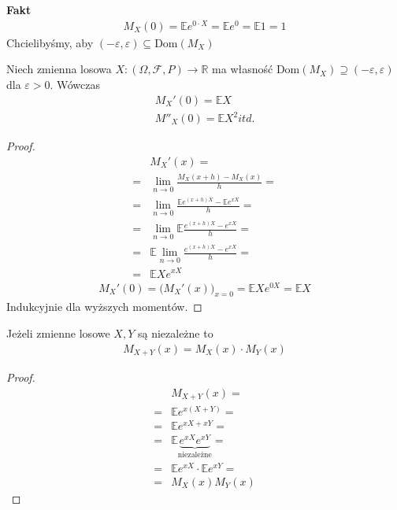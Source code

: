 \textbf{Fakt}\\
\begin{gather*}
M_X(0)=\mathbb E e^{0\cdot X}=\mathbb E e^0=\mathbb E 1=1
\end{gather*}
Chcielibyśmy, aby $ (-\varepsilon,\varepsilon)\subseteq\text{Dom}\left(M_X\right) $
\begin{twr}
Niech zmienna losowa $ X:\left(\Omega,\mathcal F ,P\right) \to \mathbb R $  ma własność Dom$ \left(M_X\right)\supseteq \left(-\varepsilon,\varepsilon\right) $ dla $ \varepsilon>0$. Wówczas
\begin{gather*}
M_X'(0)=\mathbb E X\\
M''_X(0)=\mathbb E X^2
itd.
\end{gather*}
\end{twr}
\begin{proof}
\begin{align*}
&M_X'(x)
=\\=&
\lim\limits_{n\to0}\frac{M_X(x+h)-M_X(x)}{h}
=\\=&
\lim\limits_{n\to0}\frac{\mathbb E e^{(x+h)X}-\mathbb E e^{xX}}{h}
=\\=&
\lim\limits_{n\to0}\mathbb E \frac{e^{(x+h)X}-e^{xX}}{h}
=\\=&
\mathbb E \lim\limits_{n\to0}\frac{e^{(x+h)X}-e^{xX}}{h}
=\\=&
\mathbb E Xe^{xX}
\end{align*}
\begin{gather*}
M_X'(0)=\bigl(M_X'(x)\bigr)_{x=0}=\mathbb E Xe^{0X}=\mathbb E X
\end{gather*}
Indukcyjnie dla wyższych momentów.
\end{proof}
\begin{twr}
Jeżeli zmienne losowe $ X,Y $ są niezależne to
\begin{gather*}
M_{X+Y}(x)=M_X(x)\cdot M_Y(x)
\end{gather*}
\begin{proof}
\begin{align*}
&M_{X+Y}(x)=\\=&
\mathbb E e^{x(X+Y)}
=\\=&
\mathbb E e^{xX+xY}
=\\=&
\mathbb E \underset{\text{niezależne}}{\underbrace{e^{xX}e^{xY}}}
=\\=&
\mathbb E e^{xX}\cdot \mathbb E e^{xY}
=\\=&
M_X(x)M_Y(x)
\end{align*}
\end{proof}
\end{twr}

